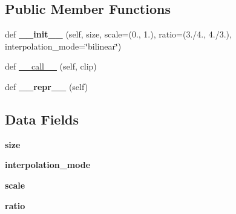 \subsection*{Public Member Functions}
\begin{DoxyCompactItemize}
\item 
\mbox{\label{classtorchvision_1_1transforms_1_1__transforms__video_1_1RandomResizedCropVideo_a8d981d5709e147ab73b2f5d149c59e12}} 
def {\bfseries \+\_\+\+\_\+init\+\_\+\+\_\+} (self, size, scale=(0., 1.), ratio=(3./4., 4./3.), interpolation\+\_\+mode=\char`\"{}bilinear\char`\"{})
\item 
def \hyperlink{classtorchvision_1_1transforms_1_1__transforms__video_1_1RandomResizedCropVideo_a63213aaed04b2f7cc4f4a10f1132f0a3}{\+\_\+\+\_\+call\+\_\+\+\_\+} (self, clip)
\item 
\mbox{\label{classtorchvision_1_1transforms_1_1__transforms__video_1_1RandomResizedCropVideo_a826a91be3b5bb32b4a01ea6df51b3fa1}} 
def {\bfseries \+\_\+\+\_\+repr\+\_\+\+\_\+} (self)
\end{DoxyCompactItemize}
\subsection*{Data Fields}
\begin{DoxyCompactItemize}
\item 
\mbox{\label{classtorchvision_1_1transforms_1_1__transforms__video_1_1RandomResizedCropVideo_a83f21c761bf492cd169821e218b58036}} 
{\bfseries size}
\item 
\mbox{\label{classtorchvision_1_1transforms_1_1__transforms__video_1_1RandomResizedCropVideo_a77655ccbae676484d553130120ab5bd2}} 
{\bfseries interpolation\+\_\+mode}
\item 
\mbox{\label{classtorchvision_1_1transforms_1_1__transforms__video_1_1RandomResizedCropVideo_a612b9355387964edc9d91ced710fd6b7}} 
{\bfseries scale}
\item 
\mbox{\label{classtorchvision_1_1transforms_1_1__transforms__video_1_1RandomResizedCropVideo_aab47b7bd0a3c5a0132450056040b05dc}} 
{\bfseries ratio}
\end{DoxyCompactItemize}
